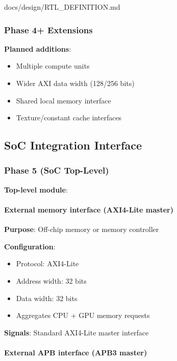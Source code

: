 \begin{relocated}{docs/design/RTL_DEFINITION.md}
\subsubsection{Phase 4+ Extensions}\label{ds:ch:rtl-definition:phase-4-extensions}

\textbf{Planned additions}:

\begin{itemize}
\tightlist
\item
  Multiple compute units
\item
  Wider AXI data width (128/256 bits)
\item
  Shared local memory interface
\item
  Texture/\allowbreak{}constant cache interfaces
\end{itemize}

\subsection{SoC Integration Interface}\label{ds:ch:rtl-definition:soc-integration-interface}

\subsubsection{Phase 5 (SoC Top-Level)}\label{ds:ch:rtl-definition:phase-5-soc-top-level}

\textbf{Top-level module}: 

\paragraph{External memory interface (AXI4-Lite master)}\label{ds:ch:rtl-definition:external-memory-interface-axi4-lite-master}

\textbf{Purpose}: Off-chip memory or memory controller

\textbf{Configuration}:

\begin{itemize}
\tightlist
\item
  Protocol: AXI4-Lite
\item
  Address width: 32 bits
\item
  Data width: 32 bits
\item
  Aggregates CPU + GPU memory requests
\end{itemize}

\textbf{Signals}: Standard AXI4-Lite master interface

\paragraph{External APB interface (APB3 master)}\label{ds:ch:rtl-definition:external-apb-interface-apb3-master}


\end{relocated}
